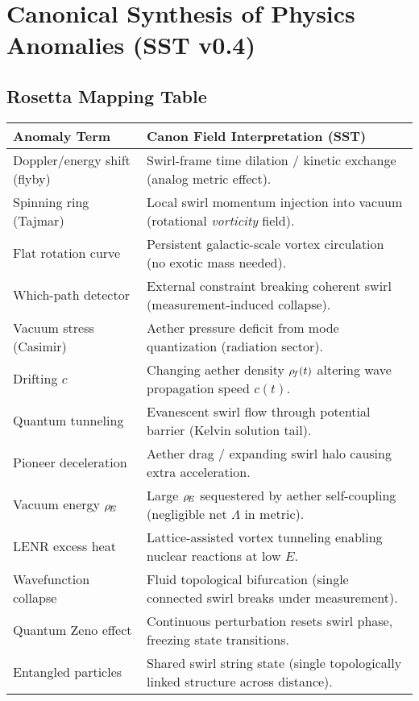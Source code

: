 \documentclass[11pt]{article}
\begin{document}
\titlepageOpen
\begin{abstract}

\end{abstract}
\titlepageClose

\newpage

\tableofcontents

\newpage

\chapter*{Canonical Synthesis of Physics Anomalies (SST v0.4)}

\section*{Rosetta Mapping Table}




\begin{tabular}{p{4.5cm} p{11cm}}
\textbf{Anomaly Term} & \textbf{Canon Field Interpretation (SST)} \\ \hline
Doppler/energy shift (flyby) & Swirl-frame time dilation / kinetic exchange (analog metric effect). \\
Spinning ring (Tajmar) & Local swirl momentum injection into vacuum (rotational \textit{vorticity} field). \\
Flat rotation curve & Persistent galactic-scale vortex circulation (no exotic mass needed). \\
Which-path detector & External constraint breaking coherent swirl (measurement-induced collapse). \\
Vacuum stress (Casimir) & Aether pressure deficit from mode quantization (radiation sector). \\
Drifting $c$ & Changing aether density $\rho_{\!f}(t)$ altering wave propagation speed $c(t)$. \\
Quantum tunneling & Evanescent swirl flow through potential barrier (Kelvin solution tail). \\
Pioneer deceleration & Aether drag / expanding swirl halo causing extra acceleration. \\
Vacuum energy $\rho_{\!E}$ & Large $\rho_{\!E}$ sequestered by aether self-coupling (negligible net $\Lambda$ in metric). \\
LENR excess heat & Lattice-assisted vortex tunneling enabling nuclear reactions at low $E$. \\
Wavefunction collapse & Fluid topological bifurcation (single connected swirl breaks under measurement). \\
Quantum Zeno effect & Continuous perturbation resets swirl phase, freezing state transitions. \\
Entangled particles & Shared swirl string state (single topologically linked structure across distance). \\
\end{tabular}
\end{document}
